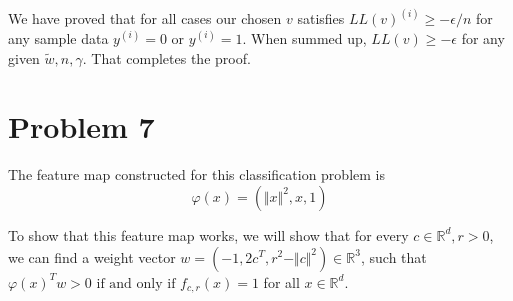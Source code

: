 \documentclass[11pt]{article}
\begin{document}
We have proved that for all cases our chosen $v$ satisfies $LL(v)^{(i)}\geq -\epsilon /n$ for any sample data $y^{(i)}=0$ or $y^{(i)}=1$. When summed up, $LL(v)\geq -\epsilon$ for any given $\widetilde{w}, n, \gamma$. That completes the proof.


\newpage
\section*{Problem 7}



The feature map constructed for this classification problem is
\begin{equation}
    \varphi (x) = (\Vert x \Vert ^2, x, 1)
\end{equation}

To show that this feature map works, we will show that for every $c \in \mathbb{R}^d, r>0$, we can find a weight vector $w = (-1, 2c^T, r^2-\Vert c\Vert ^2) \in \mathbb{R}^3$, such that $\varphi(x)^Tw>0 \text{ if and only if } f_{c,r}(x)=1$ for all $x \in \mathbb{R}^d$.\\
\end{document}
